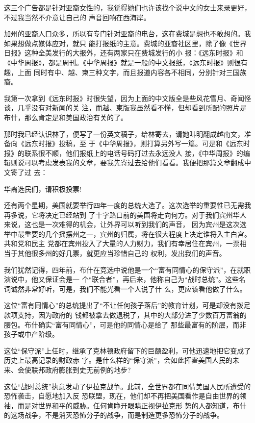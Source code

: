 ﻿\documentclass[11pt]{article}
\begin{document}
这三个广告都是针对亚裔女性的，我觉得她们也许该找个说中文的女士来录更好，不过我当然不介意让自己的
声音回响在西海岸。

加州的亚裔人口众多，所以有专门针对亚裔的电台，这在费城是想也不敢想的。我如果想做点媒体应对，就只
能打报纸的主意。费城的亚裔社区里，除了像《世界日报》这种全美发行的大报外，还有两家只在费城发行的小
报：《远东时报》和《中华周报》，都是周刊。《中华周报》就是一般的中文报纸，《远东时报》则很有趣，上面
同时有中、越、柬三种文字，而且报道内容各不相同，分别针对三国族裔。


我第一次拿到《远东时报》时很失望，因为上面的中文版全是些风花雪月、奇闻怪谈，几乎没有对新闻的关
注，而越、柬版我虽然看不懂，但却看到所配的照片是布什，那么肯定是和美国政治有关的了。

那时我已经认识林了，便写了一份英文稿子，给林寄去，请她叫明翻成越南文，准备向《远东时报》投稿，至
于《中华周报》，则打算另外写一篇。可是和《远东时报》的联系很不顺，他们报纸上的电话号码打过去永远没人
接，《中华周报》的编辑则说可以考虑发表我的文章，要我先寄过去给他们看看。我便把那篇文章翻成中文寄了过
去：

华裔选民们，请积极投票!

还有两个星期，美国就要举行四年一度的总统大选了。这次选举的重要性已无需我再多说，它将决定已经站到
了十字路口前的美国将走向何方。对于我们宾州华人来说，这也是一次难得的机会，让外界可以听到我们的声音，
因为宾州是这次选举中最重要的几个摇摆州之一，宾州的归属，将在很大程度上决定谁将入主白宫。共和党和民主
党都在宾州投入了大量的人力财力，我们有幸居住在宾州，一票相当于其他很多州的好几票，就更应当珍惜自己的
权利，发出我们的声音。

我们犹然记得，四年前，布什在竞选中说他是一个``富有同情心的保守派''，在就职演说中，他又保证会是一
个``联合者''，再后来，他称自己为``战时总统''。这些名词诚然非常好听，可是，我们不能光看一个人说了什
么，更应该看他做了什么。

这位``富有同情心''的总统提出了``不让任何孩子落后''的教育计划，可是却没有拨足款项支持，因为政府的
钱都被拿去做退税了，其中的大部分进了少数百万富翁的腰包。布什确实``富有同情心''，可是他的同情心是给了
那些最富有的阶层，而非孩子或中产阶级。

这位``保守派''上任时，继承了克林顿政府留下的巨额盈利，可他迅速地把它变成了历史上最高记录的财政赤
字。是什么样的``保守派''，会如此挥霍美国人民的未来、会使联邦政府膨胀到史无前例的地步?

这位``战时总统''执意发动了伊拉克战争。此前，全世界都在同情美国人民所遭受的恐怖袭击，自愿地加入反
恐联盟，现在，他们却不再把美国看作是自由世界的领袖，而是对世界和平的威胁。任何肯睁开眼睛正视伊拉克形
势的人都知道，布什的这场战争，不是消灭恐怖分子的战争，而是制造更多恐怖分子的战争。
\end{document}
